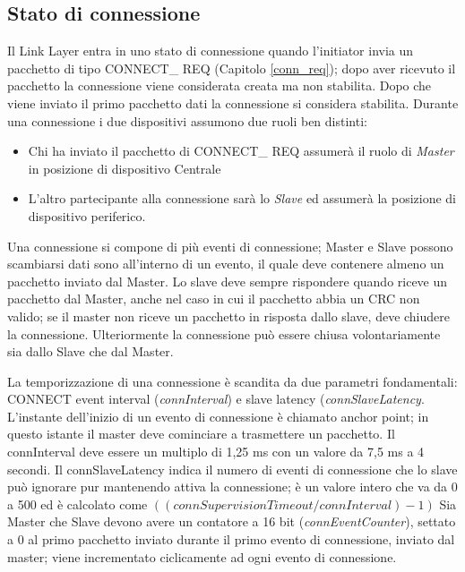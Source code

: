 \subsection{Stato di connessione}\label{connState}
Il Link Layer entra in uno stato di connessione quando l'initiator invia un pacchetto di tipo CONNECT\_ REQ (Capitolo \ref{conn_req}); dopo aver ricevuto il pacchetto la connessione viene considerata creata ma non stabilita. Dopo che viene inviato il primo pacchetto dati la connessione si considera stabilita.
Durante una connessione i due dispositivi assumono due ruoli ben distinti:
\begin{itemize}
\item Chi ha inviato il pacchetto di CONNECT\_ REQ assumerà il ruolo di \emph{Master} in posizione di dispositivo Centrale
\item L'altro partecipante alla connessione sarà lo \emph{Slave} ed assumerà la posizione di dispositivo periferico.
\end{itemize}
Una connessione si compone di più eventi di connessione; Master e Slave possono scambiarsi dati sono all'interno di un evento, il quale deve contenere almeno un pacchetto inviato dal Master. Lo slave deve sempre rispondere quando riceve un pacchetto dal Master, anche nel caso in cui il pacchetto abbia un CRC non valido; se il master non riceve un pacchetto in risposta dallo slave, deve chiudere la connessione. Ulteriormente la connessione può essere chiusa volontariamente sia dallo Slave che dal Master.


La temporizzazione di una connessione è scandita da due parametri fondamentali: CONNECT event interval (\emph{connInterval}) e slave latency (\emph{connSlaveLatency}. L'instante dell'inizio di un evento di connessione è chiamato anchor point; in questo istante il master deve cominciare a trasmettere un pacchetto.
Il connInterval deve essere un multiplo di 1,25 ms con un valore da 7,5 ms a 4 secondi.
Il connSlaveLatency indica il numero di eventi di connessione che lo slave può ignorare pur mantenendo attiva la connessione; è un valore intero che va da 0 a 500 ed è calcolato come $((connSupervisionTimeout/connInterval) - 1)$
\linebreak
Sia Master che Slave devono avere un contatore a 16 bit (\emph{connEventCounter}), settato a 0 al primo pacchetto inviato durante il primo evento di connessione, inviato dal master; viene incrementato ciclicamente ad ogni evento di connessione.

